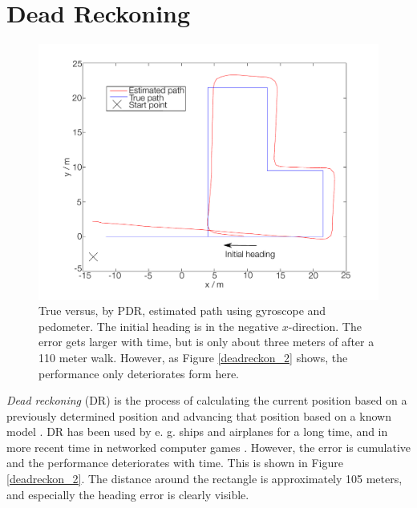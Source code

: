 \documentclass{LTHthesis}
\begin{document}
\section{Dead Reckoning}
%
\begin{figure}[!hbt]

\includegraphics[width=1\textwidth ]{images/kinematic/deadreckon_1}
\caption{True versus, by PDR, estimated path using gyroscope and pedometer. The initial heading is in the negative $x$-direction. The error gets larger with time, but is only about three meters of after a 110 meter walk. However, as Figure \ref{deadreckon_2} shows, the performance only deteriorates form here.}\label{deadreckon_1}
\end{figure}
%
\emph{Dead reckoning} (DR) is the process of calculating the current position based on a previously determined position and advancing that position based on a known model \cite{ped_dead}. DR has been used by e. g. ships and airplanes for a long time, and in more recent time in networked computer games \cite{network_game}. However, the error is cumulative and the performance deteriorates with time. This is shown in Figure \ref{deadreckon_2}. The distance around the rectangle is approximately 105 meters, and especially the heading error is clearly visible. 
\end{document}

